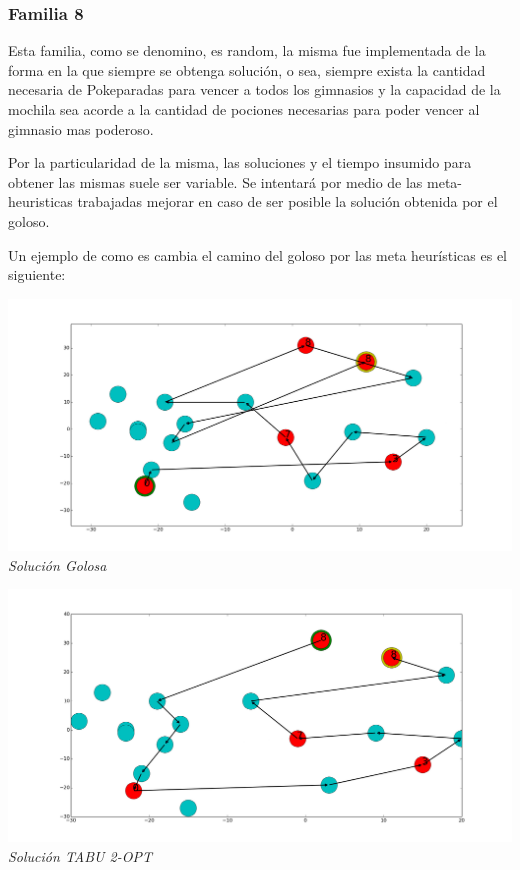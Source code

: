 \subsubsection*{Familia 8}

Esta familia, como se denomino, es random, la misma fue implementada de la forma en la que siempre se obtenga soluci\'on, o sea, siempre exista la cantidad necesaria de Pokeparadas para vencer a todos los gimnasios y la capacidad de la mochila sea acorde a la cantidad de pociones necesarias para poder vencer al gimnasio mas poderoso.

Por la particularidad de la misma, las soluciones y el tiempo insumido para obtener las mismas suele ser variable. Se intentar\'a por medio de las meta-heuristicas trabajadas mejorar en caso de ser posible la soluci\'on obtenida por el goloso.

Un ejemplo de como es cambia el camino del goloso por las meta heur\'isticas es el siguiente:\\

\vspace*{0.3cm} \vspace*{0.3cm}
  \begin{center}
 \includegraphics[scale=0.3]{./EJ4/fam8goloso.png}\\
 {            \textit{Soluci\'on Golosa}}
  \end{center}
  \vspace*{0.3cm}

\vspace*{0.3cm} \vspace*{0.3cm}
  \begin{center}
 \includegraphics[scale=0.3]{./EJ4/fam82opt.png}\\
 {            \textit{Soluci\'on TABU 2-OPT}}
  \end{center}
  \vspace*{0.3cm}

